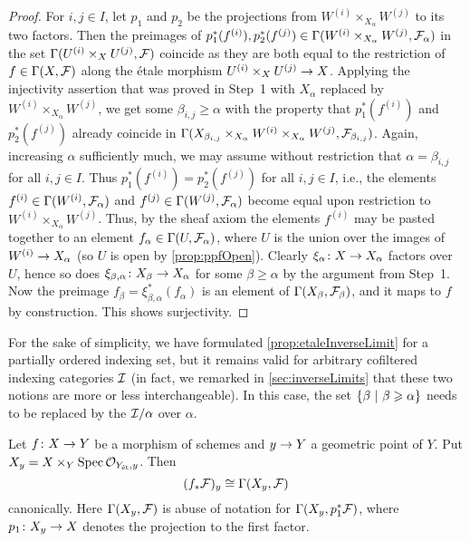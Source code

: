 \documentclass[a4paper, 10pt, oneside, DIV=9, chapterprefix=true, numbers=enddot, bibliography=totoc]{scrbook}
\begin{document}
\begin{proof}
	For $i,j\in I$, let $p_1$ and $p_2$ be the projections from $W^{(i)}\times_{X_\alpha}W^{(j)}$ to its two factors. Then the preimages of $p_1^*(f^{(i)}),p_2^*(f^{(j)})\in \operatorname{\Gamma}(W^{(i)}\times_{X_\alpha}W^{(j)},\mathcal{F}_\alpha)$ in the set $\operatorname{\Gamma}(U^{(i)}\times_XU^{(j)},\mathcal{F})$ coincide as they are both equal to the restriction of $f\in\operatorname{\Gamma}(X,\mathcal{F})$ along the étale morphism $U^{(i)}\times_XU^{(j)}\morphism X$. Applying the injectivity assertion that was proved in Step~1 with $X_\alpha$ replaced by $W^{(i)}\times_{X_\alpha}W^{(j)}$, we get some $\beta_{i,j}\geq \alpha$ with the property that $p_1^*(f^{(i)})$ and $p_2^*(f^{(j)})$ already coincide in $\operatorname{\Gamma}(X_{\beta_{i,j}}\times_{X_\alpha}W^{(i)}\times_{X_\alpha}W^{(j)},\mathcal{F}_{\beta_{i,j}})$. Again, increasing $\alpha$  sufficiently much, we may assume without restriction that $\alpha=\beta_{i,j}$ for all $i,j\in I$. Thus $p_1^*(f^{(i)})=p_2^*(f^{(j)})$ for all $i,j\in I$, i.e., the elements $f^{(i)}\in \operatorname{\Gamma} (W^{(i)},\mathcal{F}_\alpha)$ and $f^{(j)}\in \operatorname{\Gamma} (W^{(j)},\mathcal{F}_\alpha)$ become equal upon restriction to $W^{(i)}\times_{X_\alpha}W^{(j)}$. Thus, by the sheaf axiom the elements $f^{(i)}$ may be pasted together to an element $f_\alpha\in\operatorname{\Gamma}(U,\mathcal{F}_\alpha)$, where $U$ is the union over the images of $W^{(i)}\morphism X_\alpha$ (so $U$ is open by \cref{prop:ppfOpen}). Clearly $\xi_\alpha\colon X\morphism X_\alpha$ factors over $U$, hence so does $\xi_{\beta,\alpha}\colon X_\beta\morphism X_\alpha$ for some $\beta\geq \alpha$ by the argument from Step~1. Now the preimage $f_\beta=\xi_{\beta,\alpha}^*(f_\alpha)$ is an element of $\operatorname{\Gamma}(X_\beta,\mathcal{F}_\beta)$, and it maps to $f$ by construction. This shows surjectivity.
\end{proof}
\begin{rem}
	For the sake of simplicity, we have formulated \cref{prop:etaleInverseLimit} for a partially ordered indexing set, but it remains valid for arbitrary cofiltered indexing categories $\mathcal{I}$ (in fact, we remarked in \cref{sec:inverseLimits} that these two notions are more or less interchangeable). In this case, the set $\left\{\beta\ \middle|\  \beta\geqslant \alpha\right\}$ needs to be replaced by the  $\mathcal{I}/\alpha$ over $\alpha$.
\end{rem}
\begin{cor}
	Let $f\colon X\morphism Y$ be a morphism of schemes and $y\morphism Y$ a geometric point of $Y$. Put $X_y=X\times_Y\operatorname{Spec}\mathcal{O}_{Y_{\mathrm{\acute{e}t}},y}$. Then
	\begin{equation*}
		(f_*\mathcal{F})_y\cong \operatorname{\Gamma}(X_y,\mathcal{F})
	\end{equation*}
	canonically. Here $\operatorname{\Gamma}(X_y,\mathcal{F})$ is abuse of notation for $\operatorname{\Gamma}(X_y,p_1^*\mathcal{F})$, where $p_1\colon X_y\morphism X$ denotes the projection to the first factor.
\end{cor}
\end{document}

